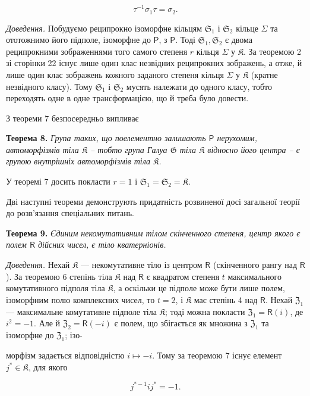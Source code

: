 \documentclass[11pt]{article}
\begin{document}
\[
\tau^{-1}\sigma_1\tau=\sigma_2.
\]

\emph{Доведення.} Побудуємо реципрокно ізоморфне кільцям \(\mathfrak S_1\) і \(\mathfrak S_2\) кільце \(\Sigma\) та ототожнимо його підполе, ізоморфне до \(\mathsf P\), з \(\mathsf P\). Тоді \(\mathfrak S_1,\mathfrak S_2\) є двома реципрокними зображеннями того самого степеня \(r\) кільця \(\Sigma\) у \(\mathfrak K\). За теоремою 2 зі сторінки 22 існує лише один клас незвідних реципрокних зображень, а отже, й лише один клас зображень кожного заданого степеня кільця \(\Sigma\) у \(\mathfrak K\) (кратне незвідного класу). Тому \(\mathfrak S_1\) і \(\mathfrak S_2\) мусять належати до одного класу, тобто переходять одне в одне трансформацією, що й треба було довести.

З теореми 7 безпосередньо випливає

\textbf{Теорема 8.} \emph{Група таких, що поелементно залишають \(\mathsf P\) нерухомим, автоморфізмів тіла \(\mathfrak K\) -- тобто група Галуа \(\mathfrak G\) тіла \(\mathfrak K\) відносно його центра -- є групою внутрішніх автоморфізмів тіла \(\mathfrak K\).}

У теоремі 7 досить покласти \(r=1\) і \(\mathfrak S_1=\mathfrak S_2=\mathfrak K\).

Дві наступні теореми демонструють придатність розвиненої досі загальної теорії до розв'язання спеціальних питань.

\textbf{Теорема 9.} \emph{Єдиним некомутативним тілом скінченного степеня, центр якого є полем \(\mathsf{R}\) дійсних чисел, є тіло кватерніонів.}

\emph{Доведення.} Нехай \(\mathfrak K\) --- некомутативне тіло із центром \(\mathsf{R}\) (скінченного рангу над \(\mathsf{R}\)). За теоремою 6 степінь тіла \(\mathfrak K\) над \(\mathsf{R}\) є квадратом степеня \(t\) максимального комутативного підполя тіла \(\mathfrak K\), а оскільки це підполе може бути лише полем, ізоморфним полю комплексних чисел, то \(t=2\), і \(\mathfrak K\) має степінь 4 над \(\mathsf{R}\). Нехай \(\mathfrak Z_1\) --- максимальне комутативне підполе тіла \(\mathfrak K\); тоді можна покласти \(\mathfrak Z_1=\mathsf{R}(i)\), де \(i^2=-1\). Але й \(\mathfrak Z_2=\mathsf{R}(-i)\) є полем, що збігається як множина з \(\mathfrak Z_1\) та ізоморфне до \(\mathfrak Z_1\); ізо-

морфізм задається відповідністю \(i\mapsto -i\). Тому за теоремою 7 існує елемент \(j^*\in\mathfrak K\), для якого

\[
j^{*-1}ij^*=-1.
\]
\end{document}
